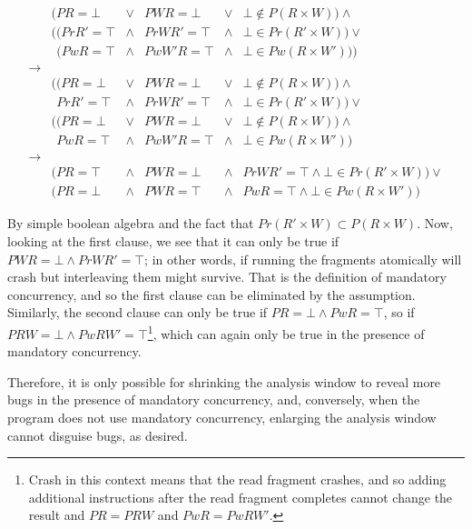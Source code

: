 \begin{displaymath}
\begin{array}{llllll}
&  (PR = \bot    & \vee   & PWR = \bot   & \vee   & \bot \not\in P(R \times W)) \wedge \\
&  ((PrR' = \top & \wedge & PrWR' = \top & \wedge & \bot \in Pr(R' \times W )) \vee \\
&\hspace{5pt}(PwR  = \top & \wedge & PwW'R = \top & \wedge & \bot \in Pw(R  \times W'))) \\
{\rightarrow}\\
&  ((PR = \bot   & \vee   & PWR = \bot    & \vee   & \bot \not\in P(R \times W)) \wedge \\
&\hspace{5pt}PrR' = \top & \wedge & PrWR'  = \top & \wedge & \bot \in Pr(R' \times W )) \vee\\
&  ((PR = \bot   & \vee   & PWR = \bot    & \vee   & \bot \not\in P(R \times W)) \wedge \\
&\hspace{5pt}PwR  = \top & \wedge & PwW'R = \top  & \wedge & \bot \in Pw(R  \times W')) \\
{\rightarrow} \\
&  (PR = \top & \wedge & PWR = \bot & \wedge & PrWR' = \top \wedge \bot \in Pr(R' \times W )) \vee \\
&  (PR = \bot & \wedge & PWR = \top & \wedge & PwR = \top \wedge \bot \in Pw(R \times W')) 
\end{array}
\end{displaymath}

By simple boolean algebra and the fact that $Pr(R' \times W) \subset
P(R \times W)$.  Now, looking at the first clause, we see that it can
only be true if $PWR = \bot \wedge PrWR' = \top$; in other words, if
running the fragments atomically will crash but interleaving them
might survive.  That is the definition of mandatory concurrency, and
so the first clause can be eliminated by the assumption.  Similarly,
the second clause can only be true if $PR = \bot \wedge PwR = \top$,
so if $PRW = \bot \wedge PwRW' = \top$\footnote{Crash in this context
  means that the read fragment crashes, and so adding additional
  instructions after the read fragment completes cannot change the
  result and $PR = PRW$ and $PwR = PwRW'$.}, which can again only
be true in the presence of mandatory concurrency.

Therefore, it is only possible for shrinking the analysis window to
reveal more bugs in the presence of mandatory concurrency, and,
conversely, when the program does not use mandatory concurrency,
enlarging the analysis window cannot disguise bugs, as desired.


